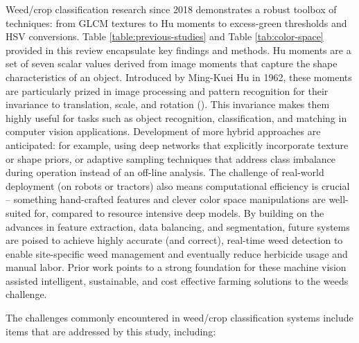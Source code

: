 \documentclass[letterpaper, notitlepage]{report}
\begin{document}
%
Weed/crop classification research since 2018 demonstrates a robust toolbox of techniques: from GLCM textures to Hu moments to excess-green thresholds and HSV conversions. Table \ref{table:previous-studies} and Table \ref{tab:color-space} provided in this review encapsulate key findings and methods. Hu moments are a set of seven scalar values derived from image moments that capture the shape characteristics of an object. Introduced by Ming-Kuei Hu in 1962, these moments are particularly prized in image processing and pattern recognition for their invariance to translation, scale, and rotation (\cite{Hu1962-dq}). This invariance makes them highly useful for tasks such as object recognition, classification, and matching in computer vision applications. Development of more hybrid approaches are anticipated: for example, using deep networks that explicitly incorporate texture or shape priors, or adaptive sampling techniques that address class imbalance during operation instead of an off-line analysis. The challenge of real-world deployment (on robots or tractors) also means computational efficiency is crucial – something hand-crafted features and clever color space manipulations  are well-suited for, compared to resource intensive deep models. By building on the advances in feature extraction, data balancing, and segmentation, future systems are poised to achieve highly accurate (and correct), real-time weed detection to enable site-specific weed management and eventually reduce herbicide usage and manual labor. Prior work points to  a strong foundation for these machine vision assisted intelligent, sustainable, and cost effective farming solutions to the weeds challenge.
%
%

The challenges commonly encountered in weed/crop classification systems include items that are addressed by this study, including:
\end{document}
